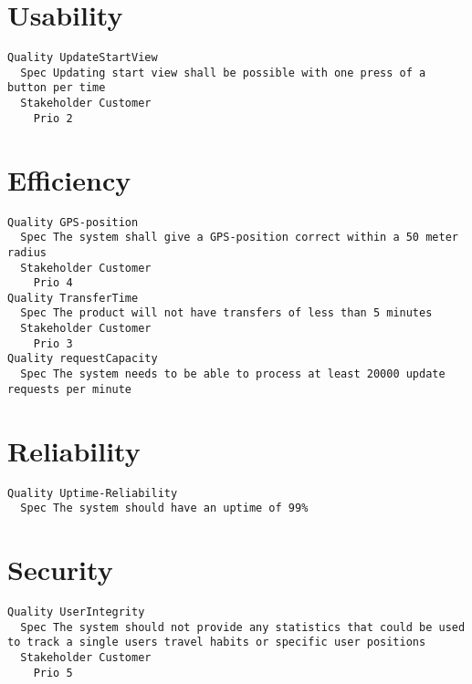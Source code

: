 \begin{lstlisting}

\end{lstlisting}


       \section{Usability}


\begin{lstlisting}
Quality UpdateStartView
  Spec Updating start view shall be possible with one press of a button per time
  Stakeholder Customer
    Prio 2

\end{lstlisting}
    
        
       \section{Efficiency}


\begin{lstlisting}
Quality GPS-position
  Spec The system shall give a GPS-position correct within a 50 meter radius
  Stakeholder Customer
    Prio 4
Quality TransferTime
  Spec The product will not have transfers of less than 5 minutes
  Stakeholder Customer
    Prio 3
Quality requestCapacity
  Spec The system needs to be able to process at least 20000 update requests per minute

\end{lstlisting}
    
        
       \section{Reliability}


\begin{lstlisting}
Quality Uptime-Reliability
  Spec The system should have an uptime of 99%

\end{lstlisting}
    
        
       \section{Security}


\begin{lstlisting}
Quality UserIntegrity
  Spec The system should not provide any statistics that could be used to track a single users travel habits or specific user positions
  Stakeholder Customer
    Prio 5

\end{lstlisting}
